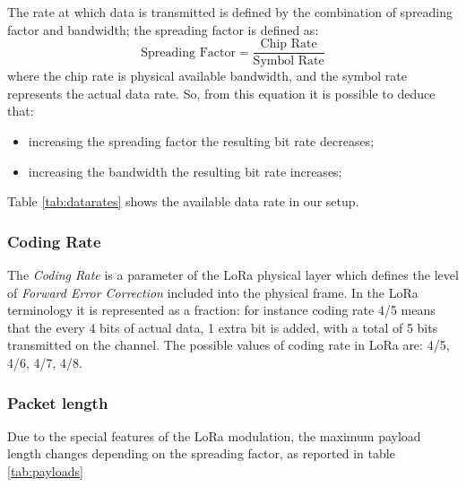 The rate at which data is transmitted is defined by the combination of spreading factor and bandwidth; the spreading factor is defined as:
\begin{equation}
\label{eq:sf}
\mbox{Spreading Factor} = \frac{\mbox{Chip Rate}}{\mbox{Symbol Rate}}
\end{equation}
where the chip rate is physical available bandwidth, and the symbol rate represents the actual data rate. So, from this equation it is possible to deduce that:
\begin{itemize}
\item increasing the spreading factor the resulting bit rate decreases;
\item increasing the bandwidth the resulting bit rate increases;
\end{itemize}
Table \ref{tab:datarates} shows the available data rate in our setup.

\subsubsection{Coding Rate}
The \emph{Coding Rate} is a parameter of the LoRa physical layer which defines the level of \emph{Forward Error Correction} included into the physical frame. In the LoRa terminology it is represented as a fraction: for instance coding rate 4/5 means that the every 4 bits of actual data, 1 extra bit is added, with a total of 5 bits transmitted on the channel. The possible values of coding rate in LoRa are: 4/5, 4/6, 4/7, 4/8.

\subsubsection{Packet length}
Due to the special features of the LoRa modulation, the maximum payload length changes depending on the spreading factor, as reported in table \ref{tab:payloads}

